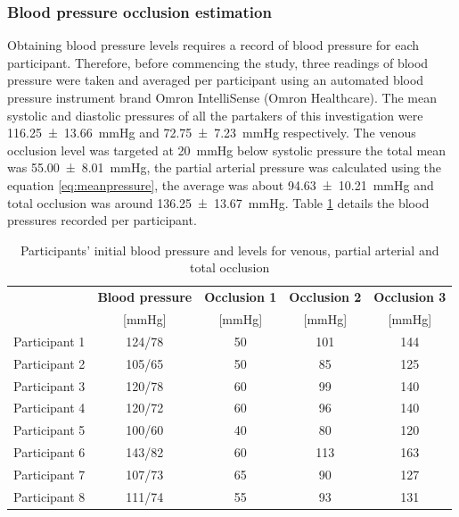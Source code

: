 \subsubsection{Blood pressure occlusion estimation}
Obtaining blood pressure levels requires a record of blood pressure for each participant. Therefore, before commencing the study, three readings of blood pressure were taken and averaged per participant using an automated blood pressure instrument brand Omron IntelliSense (Omron Healthcare). The mean systolic and diastolic pressures of all the partakers of this investigation were \SI{116.25(1366)}{\mmHg} and \SI{72.75(723)}{\mmHg} respectively. The venous occlusion level was targeted at \SI{20}{\mmHg} below systolic pressure the total mean was \SI{55.00(801)}{\mmHg}, the partial arterial pressure was calculated using the equation \ref{eq:meanpressure}, the average was about \SI{94.63(1021)}{\mmHg} and total occlusion was around \SI{136.25(1367)}{\mmHg}. Table \ref{tbl: venous occlusions} details the blood pressures recorded per participant.

\begin{table}[!htbp] %
	\caption[Blood pressure and occlusion levels of the participants]{Participants' initial blood pressure and levels for venous, partial arterial and total occlusion}
	\label{tbl: venous occlusions}
	\centering
	\begin{tabular}    {lcccc}
		\toprule
		& \textbf{Blood pressure}  &  \textbf{Occlusion 1}   & \textbf{Occlusion 2}  &  \textbf{Occlusion 3} \\
		&  [\si{\mmHg}]   &        [\si{\mmHg}]  &    [\si{\mmHg}]   &  [\si{\mmHg}]\\ \midrule
		Participant 1  &  124/78   &        50  &    101   &  144\\ 
		Participant 2  &  105/65   &        50  &     85   &  125 \\
		Participant 3  &  120/78   &        60  &     99   &  140 \\
		Participant 4  &  120/72   &        60  &     96   &  140 \\
		Participant 5  &  100/60   &        40  &     80   &  120 \\
		Participant 6  &  143/82   &        60  &    113   &  163 \\
		Participant 7  &  107/73   &        65  &     90   &  127 \\
		Participant 8  &  111/74   &        55  &     93   &  131 \\\bottomrule
	\end{tabular}
\end{table}


